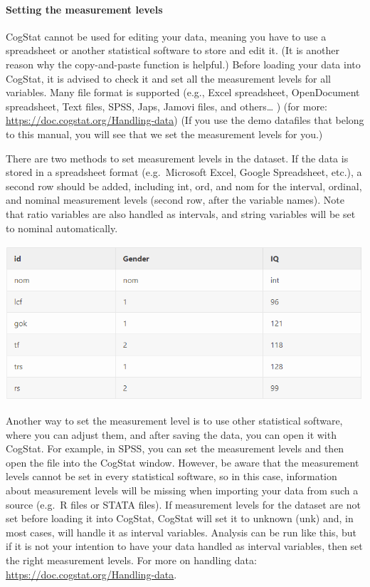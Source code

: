 \documentclass[
]{book}
\begin{document}
\hypertarget{setting-the-measurement-levels}{%
\paragraph{Setting the measurement levels}\label{setting-the-measurement-levels}}

CogStat cannot be used for editing your data, meaning you have to use a spreadsheet or another statistical software to store and edit it. (It is another reason why the copy-and-paste function is helpful.) Before loading your data into CogStat, it is advised to check it and set all the measurement levels for all variables. Many file format is supported (e.g., Excel spreadsheet, OpenDocument spreadsheet, Text files, SPSS, Japs, Jamovi files, and others\ldots{} ) (for more: \url{https://doc.cogstat.org/Handling-data}) (If you use the demo datafiles that belong to this manual, you will see that we set the measurement levels for you.)

There are two methods to set measurement levels in the dataset. If the data is stored in a spreadsheet format (e.g.~Microsoft Excel, Google Spreadsheet, etc.), a second row should be added, including int, ord, and nom for the interval, ordinal, and nominal measurement levels (second row, after the variable names). Note that ratio variables are also handled as intervals, and string variables will be set to nominal automatically.

\includegraphics{img/intro/measurementlevels.png}

Another way to set the measurement level is to use other statistical software, where you can adjust them, and after saving the data, you can open it with CogStat. For example, in SPSS, you can set the measurement levels and then open the file into the CogStat window. However, be aware that the measurement levels cannot be set in every statistical software, so in this case, information about measurement levels will be missing when importing your data from such a source (e.g.~R files or STATA files). If measurement levels for the dataset are not set before loading it into CogStat, CogStat will set it to unknown (unk) and, in most cases, will handle it as interval variables. Analysis can be run like this, but if it is not your intention to have your data handled as interval variables, then set the right measurement levels.
For more on handling data: \url{https://doc.cogstat.org/Handling-data}.
\end{document}
